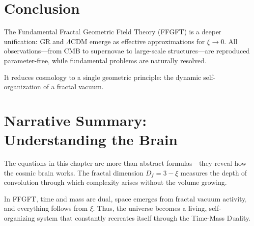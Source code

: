 	\begin{center}
		\small
	\end{center}
	
	\section*{Conclusion}
	
	The Fundamental Fractal Geometric Field Theory (FFGFT) is a deeper unification: GR and $\Lambda$CDM emerge as effective approximations for $\xi \to 0$. All observations—from CMB to supernovae to large-scale structures—are reproduced parameter-free, while fundamental problems are naturally resolved.
	
	It reduces cosmology to a single geometric principle: the dynamic self-organization of a fractal vacuum.
	
	\section*{Narrative Summary: Understanding the Brain}
	
	The equations in this chapter are more than abstract formulas—they reveal how the cosmic brain works. The fractal dimension $D_f = 3 - \xi$ measures the depth of convolution through which complexity arises without the volume growing.
	
	In FFGFT, time and mass are dual, space emerges from fractal vacuum activity, and everything follows from $\xi$. Thus, the universe becomes a living, self-organizing system that constantly recreates itself through the Time-Mass Duality.



